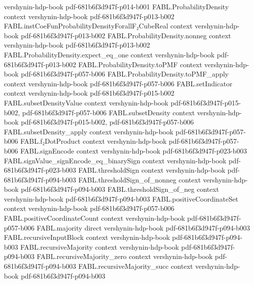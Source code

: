 \begin{theorem}
  {vershynin-hdp-book}
  {pdf-681b6f3d947f-p014-b001}
\proofstep
  {FABL.ProbabilityDensity}
  {context}
  {vershynin-hdp-book}
  {pdf-681b6f3d947f-p013-b002}
\proofstep
  {FABL.instCoeFunProbabilityDensityForallF₂CubeReal}
  {context}
  {vershynin-hdp-book}
  {pdf-681b6f3d947f-p013-b002}
\proofstep
  {FABL.ProbabilityDensity.nonneg}
  {context}
  {vershynin-hdp-book}
  {pdf-681b6f3d947f-p013-b002}
\proofstep
  {FABL.ProbabilityDensity.expect_eq_one}
  {context}
  {vershynin-hdp-book}
  {pdf-681b6f3d947f-p013-b002}
\proofstep
  {FABL.ProbabilityDensity.toPMF}
  {context}
  {vershynin-hdp-book}
  {pdf-681b6f3d947f-p057-b006}
\proofstep
  {FABL.ProbabilityDensity.toPMF_apply}
  {context}
  {vershynin-hdp-book}
  {pdf-681b6f3d947f-p057-b006}
\proofstep
  {FABL.setIndicator}
  {context}
  {vershynin-hdp-book}
  {pdf-681b6f3d947f-p015-b002}
\proofstep
  {FABL.subsetDensityValue}
  {context}
  {vershynin-hdp-book}
  {pdf-681b6f3d947f-p015-b002,
    pdf-681b6f3d947f-p057-b006}
\proofstep
  {FABL.subsetDensity}
  {context}
  {vershynin-hdp-book}
  {pdf-681b6f3d947f-p015-b002,
    pdf-681b6f3d947f-p057-b006}
\proofstep
  {FABL.subsetDensity_apply}
  {context}
  {vershynin-hdp-book}
  {pdf-681b6f3d947f-p057-b006}
\proofstep
  {FABL.f₂DotProduct}
  {context}
  {vershynin-hdp-book}
  {pdf-681b6f3d947f-p057-b006}
\proofstep
  {FABL.signEncode}
  {context}
  {vershynin-hdp-book}
  {pdf-681b6f3d947f-p023-b003}
\proofstep
  {FABL.signValue_signEncode_eq_binarySign}
  {context}
  {vershynin-hdp-book}
  {pdf-681b6f3d947f-p023-b003}
\proofstep
  {FABL.thresholdSign}
  {context}
  {vershynin-hdp-book}
  {pdf-681b6f3d947f-p094-b003}
\proofstep
  {FABL.thresholdSign_of_nonneg}
  {context}
  {vershynin-hdp-book}
  {pdf-681b6f3d947f-p094-b003}
\proofstep
  {FABL.thresholdSign_of_neg}
  {context}
  {vershynin-hdp-book}
  {pdf-681b6f3d947f-p094-b003}
\proofstep
  {FABL.positiveCoordinateSet}
  {context}
  {vershynin-hdp-book}
  {pdf-681b6f3d947f-p057-b006}
\proofstep
  {FABL.positiveCoordinateCount}
  {context}
  {vershynin-hdp-book}
  {pdf-681b6f3d947f-p057-b006}
\proofstep
  {FABL.majority}
  {direct}
  {vershynin-hdp-book}
  {pdf-681b6f3d947f-p094-b003}
\proofstep
  {FABL.recursiveInputBlock}
  {context}
  {vershynin-hdp-book}
  {pdf-681b6f3d947f-p094-b003}
\proofstep
  {FABL.recursiveMajority}
  {context}
  {vershynin-hdp-book}
  {pdf-681b6f3d947f-p094-b003}
\proofstep
  {FABL.recursiveMajority_zero}
  {context}
  {vershynin-hdp-book}
  {pdf-681b6f3d947f-p094-b003}
\proofstep
  {FABL.recursiveMajority_succ}
  {context}
  {vershynin-hdp-book}
  {pdf-681b6f3d947f-p094-b003}
\proofstep

\end{theorem}
